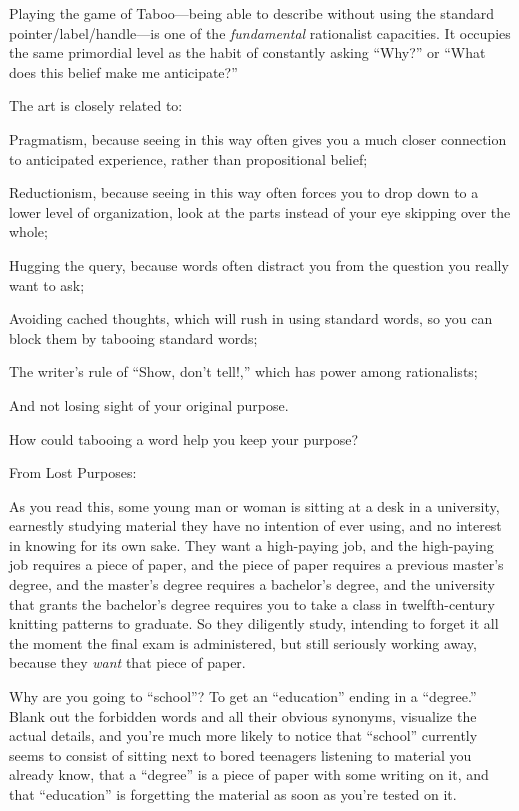 {
 Playing the game of Taboo---being able to describe without using
the standard pointer/label/handle---is one of the \textit{fundamental}
rationalist capacities. It occupies the same primordial level as the
habit of constantly asking ``Why?''
or ``What does this belief make me
anticipate?''}

{
 The art is closely related to:}

{
 Pragmatism, because seeing in this way often gives you a much
closer connection to anticipated experience, rather than propositional
belief;}

{
 Reductionism, because seeing in this way often forces you to drop
down to a lower level of organization, look at the parts instead of
your eye skipping over the whole;}

{
 Hugging the query, because words often distract you from the
question you really want to ask;}

{
 Avoiding cached thoughts, which will rush in using standard words,
so you can block them by tabooing standard words;}

{
 The writer's rule of ``Show,
don't tell!,'' which has power among
rationalists;}

{
 And not losing sight of your original purpose.}

{
 How could tabooing a word help you keep your purpose?}

{
 From Lost Purposes:}

{
 As you read this, some young man or woman is sitting at a desk in
a university, earnestly studying material they have no intention of
ever using, and no interest in knowing for its own sake. They want a
high-paying job, and the high-paying job requires a piece of paper, and
the piece of paper requires a previous master's degree,
and the master's degree requires a
bachelor's degree, and the university that grants the
bachelor's degree requires you to take a class in
twelfth-century knitting patterns to graduate. So they diligently
study, intending to forget it all the moment the final exam is
administered, but still seriously working away, because they
\textit{want} that piece of paper.}

{
 Why are you going to
``school''? To get an
``education'' ending in a
``degree.'' Blank out the forbidden
words and all their obvious synonyms, visualize the actual details, and
you're much more likely to notice that
``school'' currently seems to
consist of sitting next to bored teenagers listening to material you
already know, that a ``degree'' is a
piece of paper with some writing on it, and that
``education'' is forgetting the
material as soon as you're tested on it.}

